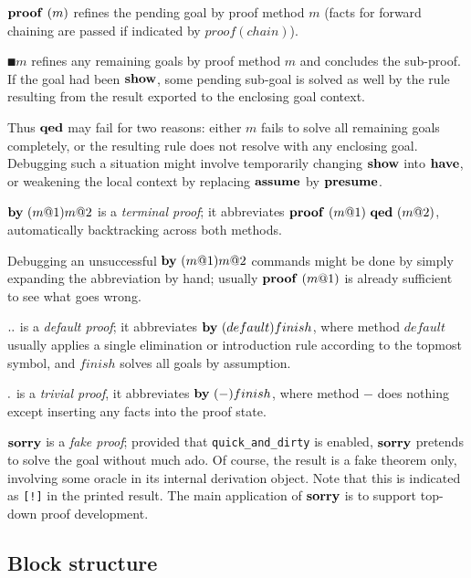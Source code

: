 \begin{descr}
\item [$\PROOF{m}$] refines the pending goal by proof method $m$ (facts for
  forward chaining are passed if indicated by $proof(chain)$).
\item [$\QED{m}$] refines any remaining goals by proof method $m$ and
  concludes the sub-proof.  If the goal had been ${\mathord{\mathbf{show}}}$, some pending
  sub-goal is solved as well by the rule resulting from the result exported to
  the enclosing goal context.
  
  Thus ${\mathord{\mathbf{qed}}}$ may fail for two reasons: either $m$ fails to solve all
  remaining goals completely, or the resulting rule does not resolve with any
  enclosing goal.  Debugging such a situation might involve temporarily
  changing ${\mathord{\mathbf{show}}}$ into ${\mathord{\mathbf{have}}}$, or weakening the local context by
  replacing ${\mathord{\mathbf{assume}}}$ by ${\mathord{\mathbf{presume}}}$.
\item [$\BY{m@1}{m@2}$] is a \emph{terminal proof}; it abbreviates
  $\PROOF{m@1}~\QED{m@2}$, automatically backtracking across both methods.
  
  Debugging an unsuccessful $\BY{m@1}{m@2}$ commands might be done by simply
  expanding the abbreviation by hand; usually $\PROOF{m@1}$ is already
  sufficient to see what goes wrong.
\item [${\mathord{\mathbf{..}}}$] is a \emph{default proof}; it abbreviates
  $\BY{default}{finish}$, where method $default$ usually applies a single
  elimination or introduction rule according to the topmost symbol, and
  $finish$ solves all goals by assumption.
\item [${\mathord{\mathbf{.}}}$] is a \emph{trivial proof}, it abbreviates
  $\BY{-}{finish}$, where method $-$ does nothing except inserting any facts
  into the proof state.
\item [${\mathord{\mathbf{sorry}}}$] is a \emph{fake proof}; provided that
  \texttt{quick_and_dirty} is enabled, ${\mathord{\mathbf{sorry}}}$ pretends to solve
  the goal without much ado.  Of course, the result is a fake theorem only,
  involving some oracle in its internal derivation object.  Note that this is
  indicated as \texttt{[!]} in the printed result.  The main application of
  ${\mathord{\mathbf{sorry}}}$ is to support top-down proof development.
\end{descr}


\subsection{Block structure}

